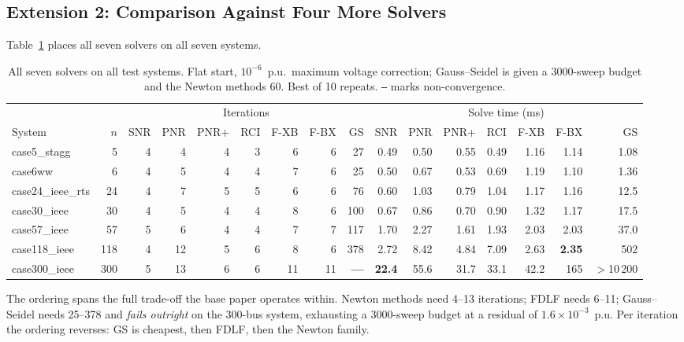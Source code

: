 \documentclass[sigconf,nonacm]{acmart}
\begin{document}
\subsection{Extension 2: Comparison Against Four More Solvers}
\label{sec:res-methods}
Table~\ref{tab:methods} places all seven solvers on all seven systems.

\begin{table}[t]
\centering
\caption{All seven solvers on all test systems. Flat start, $10^{-6}$~p.u.\
maximum voltage correction; Gauss--Seidel is given a 3000-sweep budget and the
Newton methods 60. Best of 10 repeats. \texttt{---} marks non-convergence.}
\label{tab:methods}
\small
\begin{tabular}{l r r r r r r r r r r r r r r r}
\toprule
& & \multicolumn{7}{c}{Iterations} & \multicolumn{7}{c}{Solve time (ms)} \\
\cmidrule(lr){3-9}\cmidrule(lr){10-16}
System & $n$ & SNR & PNR & PNR+ & RCI & F-XB & F-BX & GS
& SNR & PNR & PNR+ & RCI & F-XB & F-BX & GS \\
\midrule
case5\_stagg      & 5   & 4 & 4  & 4 & 3 & 6  & 6  & 27    & 0.49  & 0.50  & 0.55  & 0.49  & 1.16 & 1.14 & 1.08 \\
case6ww           & 6   & 4 & 5  & 4 & 4 & 7  & 6  & 25    & 0.50  & 0.67  & 0.53  & 0.69  & 1.19 & 1.10 & 1.36 \\
case24\_ieee\_rts & 24  & 4 & 7  & 5 & 5 & 6  & 6  & 76    & 0.60  & 1.03  & 0.79  & 1.04  & 1.17 & 1.16 & 12.5 \\
case30\_ieee      & 30  & 4 & 5  & 4 & 4 & 8  & 6  & 100   & 0.67  & 0.86  & 0.70  & 0.90  & 1.32 & 1.17 & 17.5 \\
case57\_ieee      & 57  & 5 & 6  & 4 & 4 & 7  & 7  & 117   & 1.70  & 2.27  & 1.61  & 1.93  & 2.03 & 2.03 & 37.0 \\
case118\_ieee     & 118 & 4 & 12 & 5 & 6 & 8  & 6  & 378   & 2.72  & 8.42  & 4.84  & 7.09  & 2.63 & \textbf{2.35} & 502 \\
case300\_ieee     & 300 & 5 & 13 & 6 & 6 & 11 & 11 & \textbf{---} & \textbf{22.4} & 55.6 & 31.7 & 33.1 & 42.2 & 165 & $>$10\,200 \\
\bottomrule
\end{tabular}
\end{table}

The ordering spans the full trade-off the base paper operates within. Newton
methods need 4--13 iterations; FDLF needs 6--11; Gauss--Seidel needs 25--378 and
\emph{fails outright} on the 300-bus system, exhausting a 3000-sweep budget at a
residual of $1.6\times10^{-3}$~p.u. Per iteration the ordering reverses: GS is
cheapest, then FDLF, then the Newton family.
\end{document}

